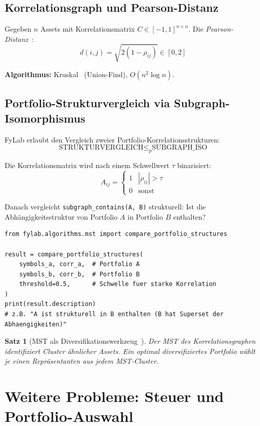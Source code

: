\documentclass[a4paper,12pt]{article}
\newtheorem{satz}{Satz}
\begin{document}
\subsection{Korrelationsgraph und Pearson-Distanz}

Gegeben $n$ Assets mit Korrelationsmatrix $C \in [-1,1]^{n \times n}$.
Die \emph{Pearson-Distanz}~\cite{mantegna1999}:
\[
    d(i,j) = \sqrt{2(1 - \rho_{ij})} \in [0, 2]
\]

\textbf{Algorithmus:} Kruskal~\cite{kruskal1956, cormen2022} (Union-Find), $O(n^2 \log n)$.

\subsection{Portfolio-Strukturvergleich via Subgraph-Isomorphismus}

FyLab erlaubt den Vergleich zweier Portfolio-Korrelationsstrukturen:
\[
    \text{STRUKTURVERGLEICH} \leq_p \text{SUBGRAPH\_ISO}
\]

Die Korrelationsmatrix wird nach einem Schwellwert $\tau$ binarisiert:
\[
    A_{ij} = \begin{cases} 1 & |\rho_{ij}| > \tau \\ 0 & \text{sonst} \end{cases}
\]

Danach vergleicht \texttt{subgraph\_contains(A, B)} strukturell:
Ist die Abhängigkeitsstruktur von Portfolio $A$ in Portfolio $B$ enthalten?

\begin{lstlisting}[caption=Portfolio-Strukturvergleich]
from fylab.algorithms.mst import compare_portfolio_structures

result = compare_portfolio_structures(
    symbols_a, corr_a,  # Portfolio A
    symbols_b, corr_b,  # Portfolio B
    threshold=0.5,      # Schwelle fuer starke Korrelation
)
print(result.description)
# z.B. "A ist strukturell in B enthalten (B hat Superset der Abhaengigkeiten)"
\end{lstlisting}

\begin{satz}[MST als Diversifikationswerkzeug~\protect\cite{mantegna1999, markowitz1952}]
    Der MST des Korrelationsgraphen identifiziert Cluster ähnlicher Assets.
    Ein optimal diversifiziertes Portfolio wählt je einen Repräsentanten
    aus jedem MST-Cluster.
\end{satz}

\section{Weitere Probleme: Steuer und Portfolio-Auswahl}
\label{sec:np_probleme}
\end{document}
